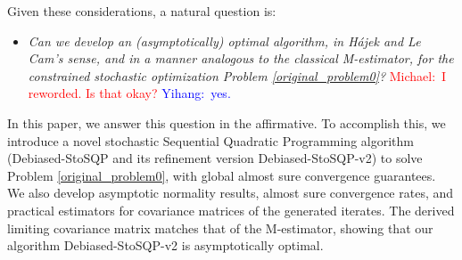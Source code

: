 \documentclass[aos]{imsart}
\numberwithin{equation}{section}
\theoremstyle{plain}
\newcommand{\michael}[1]{\textcolor{red}{Michael:\ #1}}
\newcommand{\yihang}[1]{\textcolor{blue}{Yihang:\ #1}}
\begin{document}
Given these considerations, a natural question is: 
\begin{itemize}
\item \textit{Can we develop an (asymptotically) optimal algorithm, in H\'ajek and Le Cam's sense, and in a manner analogous to the classical M-estimator, for the constrained stochastic optimization Problem \eqref{original_problem0}?}
\michael{I reworded.  Is that okay?} \yihang{yes.}
\end{itemize}

\noindent 
In this paper, we answer this question in the affirmative. 
To accomplish this, we introduce a novel stochastic Sequential Quadratic Programming algorithm (Debiased-StoSQP and its refinement version Debiased-StoSQP-v2)
to solve Problem \eqref{original_problem0}, with global almost sure convergence guarantees.
We also develop asymptotic normality results, almost sure convergence rates, and practical estimators for covariance matrices of the generated iterates. The derived limiting covariance matrix matches that of the M-estimator, showing that our algorithm Debiased-StoSQP-v2 is asymptotically optimal. 
\end{document}
